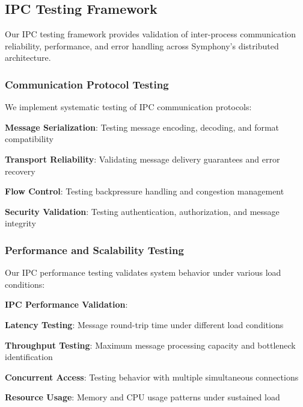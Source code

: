 \subsection*{IPC Testing Framework}

Our IPC testing framework provides validation of inter-process communication reliability, performance, and error handling across Symphony's distributed architecture.

\subsubsection*{Communication Protocol Testing}

We implement systematic testing of IPC communication protocols:

\begin{compactlist}
    \item \textbf{Message Serialization}: Testing message encoding, decoding, and format compatibility
    \item \textbf{Transport Reliability}: Validating message delivery guarantees and error recovery
    \item \textbf{Flow Control}: Testing backpressure handling and congestion management
    \item \textbf{Security Validation}: Testing authentication, authorization, and message integrity
\end{compactlist}

\subsubsection*{Performance and Scalability Testing}

Our IPC performance testing validates system behavior under various load conditions:

\begin{successbox}
\textbf{IPC Performance Validation}:
\begin{compactlist}
    \item \textbf{Latency Testing}: Message round-trip time under different load conditions
    \item \textbf{Throughput Testing}: Maximum message processing capacity and bottleneck identification
    \item \textbf{Concurrent Access}: Testing behavior with multiple simultaneous connections
    \item \textbf{Resource Usage}: Memory and CPU usage patterns under sustained load
\end{compactlist}
\end{successbox}

